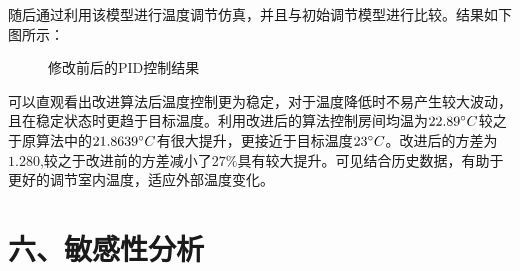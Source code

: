 \documentclass{my_paper}
\begin{document}
随后通过利用该模型进行温度调节仿真，并且与初始调节模型进行比较。结果如下图所示：
\begin{figure}[htbp]
    \centering  %
    \caption{修改前后的PID控制结果}    %
    \label{fig:1}    %
\end{figure}

可以直观看出改进算法后温度控制更为稳定，对于温度降低时不易产生较大波动，且在稳定状态时更趋于目标温度。利用改进后的算法控制房间均温为$22.89\degree C$较之于原算法中的$21.8639\degree C$有很大提升，更接近于目标温度$23\degree C$。改进后的方差为$1.280$,较之于改进前的方差减小了$27\%$具有较大提升。可见结合历史数据，有助于更好的调节室内温度，适应外部温度变化。

\section{六、敏感性分析}
\end{document}
